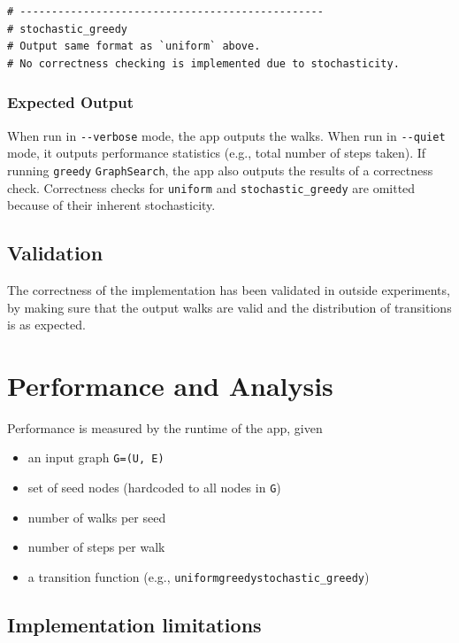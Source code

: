\documentclass[10pt,oneside]{memoir}
\providecommand{\tightlist}{%
  \setlength{\itemsep}{0pt}\setlength{\parskip}{0pt}}
\begin{document}
\begin{verbatim}
# ------------------------------------------------
# stochastic_greedy
# Output same format as `uniform` above.
# No correctness checking is implemented due to stochasticity.
\end{verbatim}

\hypertarget{expected-output-1}{%
\subsubsection{Expected Output}\label{expected-output-1}}

When run in \texttt{-\/-verbose} mode, the app outputs the walks. When
run in \texttt{-\/-quiet} mode, it outputs performance statistics (e.g.,
total number of steps taken). If running \texttt{greedy}
\texttt{GraphSearch}, the app also outputs the results of a correctness
check. Correctness checks for \texttt{uniform} and
\texttt{stochastic\_greedy} are omitted because of their inherent
stochasticity.

\hypertarget{validation}{%
\subsection{Validation}\label{validation}}

The correctness of the implementation has been validated in outside
experiments, by making sure that the output walks are valid and the
distribution of transitions is as expected.

\hypertarget{performance-and-analysis-3}{%
\section{Performance and Analysis}\label{performance-and-analysis-3}}

Performance is measured by the runtime of the app, given

\begin{itemize}
\tightlist
\item
  an input graph \texttt{G=(U,\ E)}
\item
  set of seed nodes (hardcoded to all nodes in \texttt{G})
\item
  number of walks per seed
\item
  number of steps per walk
\item
  a transition function (e.g.,
  \texttt{uniform\textbar{}greedy\textbar{}stochastic\_greedy})
\end{itemize}

\hypertarget{implementation-limitations-3}{%
\subsection{Implementation
limitations}\label{implementation-limitations-3}}
\end{document}
